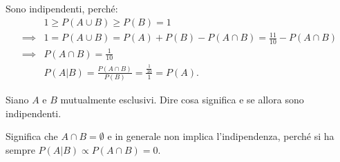 \begin{solution}
	Sono indipendenti, perché:
	\begin{align*}
		&1 \ge P(A\cup B) \ge P(B) = 1 \\
		\implies &1 = P(A\cup B) = P(A) + P(B) - P(A\cap B) = \frac{11}{10} - P(A\cap B) \\
		\implies &P(A\cap B) = \frac{1}{10} \\
		&P(A|B) = \frac{P(A\cap B)}{P(B)} = \frac{\frac{1}{10}}{1} = P(A).
	\end{align*}
\end{solution}

\begin{exercise}
	Siano $A$ e $B$ mutualmente esclusivi. Dire cosa significa e se allora sono indipendenti.
\end{exercise}

\begin{solution}
	Significa che $A\cap B=\emptyset$ e in generale non implica l'indipendenza, perché si ha sempre $P(A|B)\propto P(A\cap B)=0$.
\end{solution}
